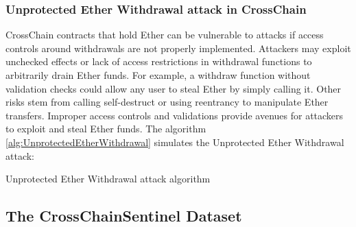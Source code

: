\documentclass[sigconf]{acmart}
\begin{document}
\subsubsection{Unprotected Ether Withdrawal attack in CrossChain}
CrossChain contracts that hold Ether can be vulnerable to attacks if access controls around withdrawals are not properly implemented. Attackers may exploit unchecked effects or lack of access restrictions in withdrawal functions to arbitrarily drain Ether funds. For example, a withdraw function without validation checks could allow any user to steal Ether by simply calling it. Other risks stem from calling self-destruct or using reentrancy to manipulate Ether transfers. Improper access controls and validations provide avenues for attackers to exploit and steal Ether funds. The algorithm \ref{alg:UnprotectedEtherWithdrawal} simulates the Unprotected Ether Withdrawal attack:

\begin{algorithm}[h]
\caption{Unprotected Ether Withdrawal attack algorithm}
\label{alg:UnprotectedEtherWithdrawal}
\begin{flushleft}

\end{flushleft}
\end{algorithm}




\subsection{The CrossChainSentinel Dataset}
\end{document}
